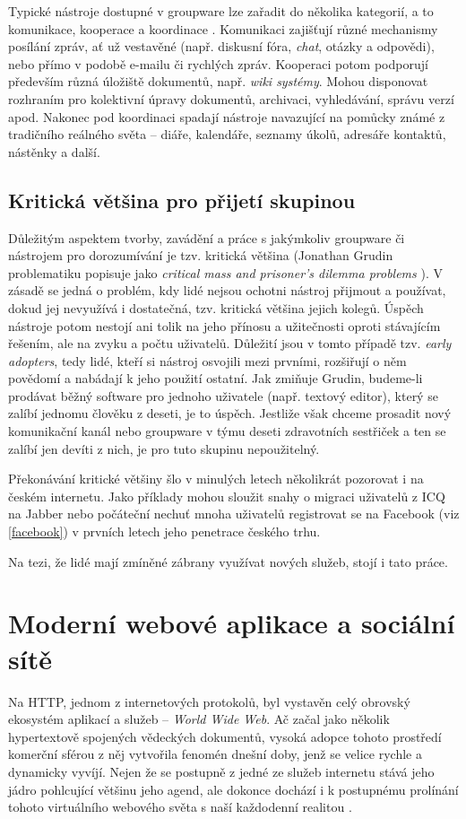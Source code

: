 \documentclass[12pt,oneside,final]{fithesis2}
\begin{document}
Typické nástroje dostupné v groupware lze zařadit do několika kategorií, a to komunikace, kooperace a koordinace \cite{kunstova1999skupinova}. Komunikaci zajišťují různé mechanismy posílání zpráv, ať už vestavěné (např. diskusní fóra, {\it chat}, otázky a odpovědi), nebo přímo v podobě e-mailu či rychlých zpráv. Kooperaci potom podporují především různá úložiště dokumentů, např. {\it wiki systémy}. Mohou disponovat rozhraním pro kolektivní úpravy dokumentů, archivaci, vyhledávání, správu verzí apod. Nakonec pod koordinaci spadají nástroje navazující na pomůcky známé z tradičního reálného světa -- diáře, kalendáře, seznamy úkolů, adresáře kontaktů, nástěnky a další.

\subsection{Kritická většina pro přijetí skupinou}\label{criticalMass}
Důležitým aspektem tvorby, zavádění a práce s jakýmkoliv groupware či nástrojem pro dorozumívání je tzv. kritická většina (Jonathan Grudin problematiku popisuje jako {\it critical mass and prisoner's dilemma problems} \cite{grudin1994groupware}). V zásadě se jedná o problém, kdy lidé nejsou ochotni nástroj přijmout a používat, dokud jej nevyužívá i dostatečná, tzv. kritická většina jejich kolegů. Úspěch nástroje potom nestojí ani tolik na jeho přínosu a užitečnosti oproti stávajícím řešením, ale na zvyku a počtu uživatelů. Důležití jsou v tomto případě tzv. {\it early adopters}, tedy lidé, kteří si nástroj osvojili mezi prvními, rozšiřují o něm povědomí a nabádají k jeho použití ostatní. Jak zmiňuje Grudin, budeme-li prodávat běžný software pro jednoho uživatele (např. textový editor), který se zalíbí jednomu člověku z deseti, je to úspěch. Jestliže však chceme prosadit nový komunikační kanál nebo groupware v týmu deseti zdravotních sestřiček a ten se zalíbí jen devíti z nich, je pro tuto skupinu nepoužitelný.

Překonávání kritické většiny šlo v minulých letech několikrát pozorovat i na českém internetu. Jako příklady mohou sloužit snahy o migraci uživatelů z ICQ na Jabber nebo počáteční nechuť mnoha uživatelů registrovat se na Facebook (viz \ref{facebook}) v prvních letech jeho penetrace českého trhu.

Na tezi, že lidé mají zmíněné zábrany využívat nových služeb, stojí i tato práce.


\section{Moderní webové aplikace a sociální sítě}\label{web}
Na HTTP, jednom z internetových protokolů, byl vystavěn celý obrovský ekosystém aplikací a služeb -- {\it World Wide Web}. Ač začal jako několik hypertextově spojených vědeckých dokumentů, vysoká adopce tohoto prostředí komerční sférou z něj vytvořila fenomén dnešní doby, jenž se velice rychle a dynamicky vyvíjí. Nejen že se postupně z jedné ze služeb internetu stává jeho jádro pohlcující většinu jeho agend, ale dokonce dochází i k postupnému prolínání tohoto virtuálního webového světa s naší každodenní realitou \cite{thurlow2004computer}.
\end{document}
